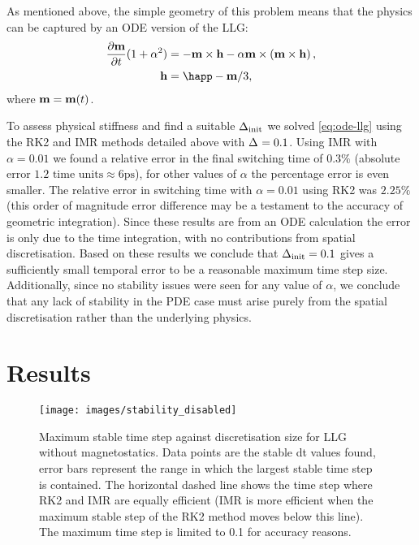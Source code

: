 As mentioned above, the simple geometry of this problem means that the physics can be captured by an ODE version of the LLG:
\begin{equation}
  \label{eq:ode-llg}
  \begin{aligned}
    \dmdt (1 + \dampc^2) &= - \mv \times \hv - \dampc \mv \times \left( \mv \times \hv \right), \\
    \hv &= \happ - \mv/3,
  \end{aligned}
\end{equation}
where $\mathbf{m} = \mathbf{m}(t)$.

To assess physical stiffness and find a suitable $\Delta_{\text{init}}$ we solved \eqref{eq:ode-llg} using the RK2 and IMR methods detailed above with $\Delta_{} = 0.1$.
Using IMR with $\alpha = 0.01$ we found a relative error in the final switching time of $0.3\%$ (absolute error  $1.2 \text{ time units} \approx 6\text{ps}$), for other values of $\alpha$ the percentage error is even smaller.
The relative error in switching time with $\alpha = 0.01$ using RK2 was $2.25\%$ (this order of magnitude error difference may be a testament to the accuracy of geometric integration\cite{DAquino2005}).
Since these results are from an ODE calculation the error is only due to the time integration, with no contributions from spatial discretisation.
Based on these results we conclude that $\Delta_{\text{init}} = 0.1$ gives a sufficiently small temporal error to be a reasonable maximum time step size.
Additionally, since no stability issues were seen for any value of $\alpha$, we conclude that any lack of stability in the PDE case must arise purely from the spatial discretisation rather than the underlying physics.



\section{Results}


\begin{figure}
  \centering
  \texttt{[image: images/stability\_disabled]}
  \caption{Maximum stable time step against discretisation size for LLG without magnetostatics. Data points are the stable dt values found, error bars represent the range in which the largest stable time step is contained. The horizontal dashed line shows the time step where RK2 and IMR are equally efficient (IMR is more efficient when the maximum stable step of the RK2 method moves below this line). The maximum time step is limited to 0.1 for accuracy reasons.}
  \label{fig:no-hms-stability}
\end{figure}


